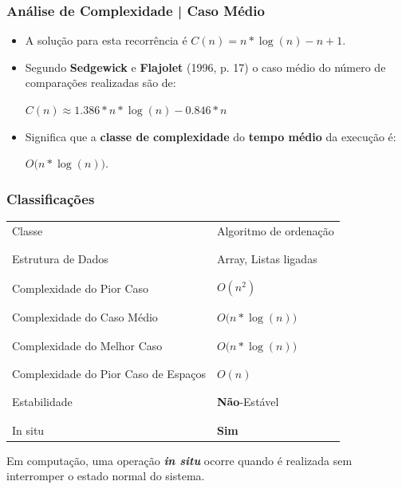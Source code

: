 \documentclass[
	11pt, %
]{beamer}
\begin{document}
\begin{frame}
	\frametitle{Análise de Complexidade | Caso Médio}
	
	{\small
		\begin{itemize}
			\item A solução para esta recorrência é $C(n) = n*\log(n) - n + 1$.
			\item Segundo \textbf{Sedgewick} e \textbf{Flajolet} (1996, p. 17) o caso médio do número de comparações realizadas são de: 
		
			\begin{center}
			$C(n) \approx 1.386 * n*\log(n) - 0.846*n$
			\end{center}
	
			\item Significa que a \textbf{classe de complexidade} do \textbf{tempo médio} da execução é:
			\begin{center}
			$O\bigg(n*\log(n)\bigg)$.
			\end{center}
		\end{itemize}
	}
\end{frame}

\begin{frame}
	\frametitle{Classificações}
	{\tiny
	\begin{table}[]
		\begin{tabular}{l|l}
			Classe & Algoritmo de ordenação \\
			\\ \hline \\
			Estrutura de Dados & Array, Listas ligadas \\
			\\ \hline \\
			Complexidade do Pior Caso & $O(n^{2})$ \\
			\\ \hline \\
			Complexidade do Caso Médio & $O\bigg(n*\log(n)\bigg)$ \\
			\\ \hline \\
			Complexidade do Melhor Caso & $O\bigg(n*\log(n)\bigg)$ \\
			\\ \hline \\
			Complexidade do Pior Caso de Espaços & $O(n)$ \\ 
			\\ \hline \\
			Estabilidade & \textbf{Não}-Estável \\
			\\ \hline \\
			In situ & \textbf {Sim}
		\end{tabular}
	\end{table}
	}

	{\tiny Em computação, uma operação \textbf{\textit{in situ}} ocorre quando é realizada sem interromper o estado normal do sistema.}
\end{frame}
\end{document}
